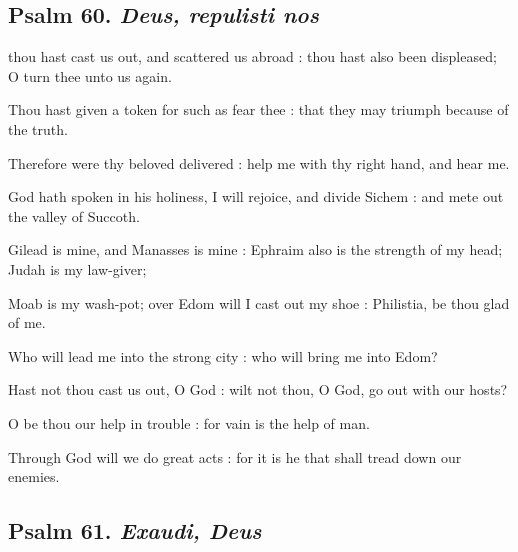 \subsection{Psalm 60. \textit{Deus, repulisti nos}}

 thou hast cast us out, and scattered us abroad : thou hast also been displeased; O turn thee unto us again.\par
{}
Thou hast given a token for such as fear thee : that they may triumph because of the truth.\par
{}Therefore were thy beloved delivered : help me with thy right hand, and hear me.\par
{}God hath spoken in his holiness, I will rejoice, and divide Sichem : and mete out the valley of Succoth.\par
{}Gilead is mine, and Manasses is mine : Ephraim also is the strength of my head; Judah is my law-giver;\par
{}Moab is my wash-pot; over Edom will I cast out my shoe : Philistia, be thou glad of me.\par
{}Who will lead me into the strong city : who will bring me into Edom?\par
{}Hast not thou cast us out, O God : wilt not thou, O God, go out with our hosts?\par
{}O be thou our help in trouble : for vain is the help of man.\par
{}Through God will we do great acts : for it is he that shall tread down our enemies.\par

\clearpage
\subsection{Psalm 61. \textit{Exaudi, Deus}}

